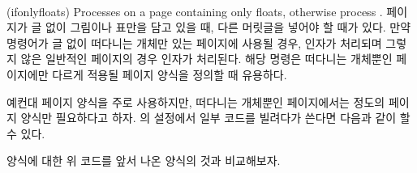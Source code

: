 \begin{syntax}
 \\
\end{syntax}
\glossary(ifonlyfloats)%
  {}%
  {Processes  on a page containing only floats, otherwise process
  .}
페이지가 글 없이 그림이나 표만을 담고 있을 때,
다른 머릿글을 넣어야 할 때가 있다.
만약  명령어가 글 없이 떠다니는 개체만 있는 페이지에 사용될
경우,  인자가 처리되며 그렇지 않은 일반적인 페이지의 경우 
인자가 처리된다.
해당 명령은 떠다니는 개체뿐인
페이지에만 다르게 적용될 페이지
양식을 정의할 때 유용하다.

예컨대  페이지 양식을 주로 사용하지만, 떠다니는 개체뿐인
페이지에서는  정도의 페이지 양식만 필요하다고 하자.
의 설정에서 일부 코드를 빌려다가 쓴다면 다음과 같이 할 수
있다.
\begin{lcode}
%
  {\ifonlyfloats{0pt}{\normalrulethickness}}
%
             {\ifonlyfloats{}{\normalfont\bfseries\thepage}}%
             {}%
             {\ifonlyfloats{}{\normalfont\bfseries\leftmark}}
%
             {\ifonlyfloats{}{\normalfont\bfseries\rightmark}}%
             {}%
             {\ifonlyfloats{}{\normalfont\bfseries\thepage}}
\end{lcode}
 양식에 대한 위 코드를 앞서 나온  양식의
것과 비교해보자.

